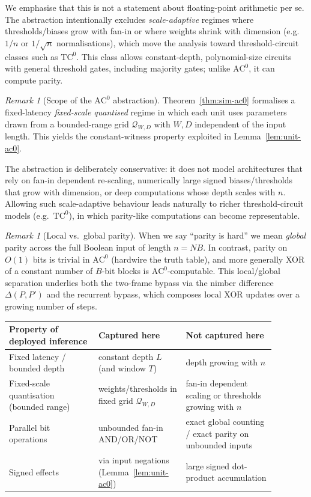\documentclass[11pt]{article}
\newcommand{\AC}{\mathrm{AC}}
\newcommand{\TC}{\mathrm{TC}}
\newcommand{\Qset}{\mathcal{Q}}
\theoremstyle{plain}
\theoremstyle{definition}
\theoremstyle{remark}
\newtheorem{remark}[theorem]{Remark}
\numberwithin{equation}{section}
\begin{document}
We emphasise that this is not a statement about floating-point arithmetic per se.
The abstraction intentionally excludes \emph{scale-adaptive} regimes where thresholds/biases grow with fan-in or where weights shrink with dimension (e.g.\ $1/n$ or $1/\sqrt{n}$ normalisations), which move the analysis toward threshold-circuit classes such as $\TC^0$. This class allows constant-depth, polynomial-size circuits with general threshold gates, including majority gates; unlike $\AC^0$, it can compute parity.
\begin{remark}[Scope of the $\AC^0$ abstraction]
\label{rem:ac0-scope}
Theorem~\ref{thm:sim-ac0} formalises a fixed-latency \emph{fixed-scale quantised} regime in which each unit uses parameters drawn from a bounded-range grid $\Qset_{W,D}$ with $W,D$ independent of the input length.
This yields the constant-witness property exploited in Lemma~\ref{lem:unit-ac0}.

The abstraction is deliberately conservative: it does not model architectures that rely on fan-in dependent re-scaling, numerically large signed biases/thresholds that grow with dimension, or deep computations whose depth scales with $n$.
Allowing such scale-adaptive behaviour leads naturally to richer threshold-circuit models (e.g.\ $\TC^0$), in which parity-like computations can become representable.
\end{remark}

\begin{remark}[Local vs.\ global parity]
\label{rem:local-vs-global-parity}
When we say ``parity is hard'' we mean \emph{global} parity across the full Boolean input of length $n=NB$.
In contrast, parity on $O(1)$ bits is trivial in $\AC^0$ (hardwire the truth table), and more generally XOR of a constant number of $B$-bit blocks is $\AC^0$-computable.
This local/global separation underlies both the two-frame bypass via the nimber difference $\Delta(P,P')$ and the recurrent bypass, which composes local XOR updates over a growing number of steps.
\end{remark}

\begin{center}
\begin{tabular}{|>{\raggedright\arraybackslash}p{0.30\linewidth}|>{\raggedright\arraybackslash}p{0.28\linewidth}|>{\raggedright\arraybackslash}p{0.30\linewidth}|}
\hline
\textbf{Property of deployed inference} & \textbf{Captured here} & \textbf{Not captured here} \\
\hline
Fixed latency / bounded depth & constant depth $L$ (and window $T$) & depth growing with $n$ \\
\hline
Fixed-scale quantisation (bounded range) & weights/thresholds in fixed grid $\Qset_{W,D}$ & fan-in dependent scaling or thresholds growing with $n$ \\
\hline
Parallel bit operations & unbounded fan-in AND/OR/NOT & exact global counting / exact parity on unbounded inputs \\
\hline
Signed effects & via input negations (Lemma~\ref{lem:unit-ac0}) & large signed dot-product accumulation \\
\hline
\end{tabular}
\end{center}
\end{document}
